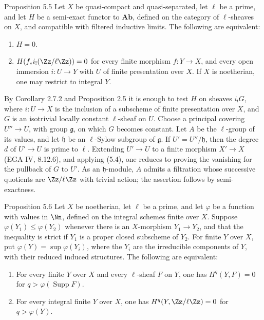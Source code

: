 \begin{statement}{Proposition 5.5}
Let \(X\) be quasi-compact and quasi-separated, let \(\ell\) be a prime, and let \(H\) be a semi-exact functor to \(\mathbf{Ab}\), defined on the category of \(\ell\)-sheaves on \(X\), and compatible with filtered inductive limits. The following are equivalent:
\begin{enumerate}[label=(\roman*)]
\item \(H=0\).
\item \(H(f_*i_!(\Zz/\ell\Zz))=0\) for every finite morphism \(f:Y\to X\), and every open immersion \(i:U\to Y\) with \(U\) of finite presentation over \(X\). If \(X\) is noetherian, one may restrict to integral \(Y\).
\end{enumerate}
\end{statement}

\begin{prooftext}
By Corollary 2.7.2 and Proposition 2.5 it is enough to test \(H\) on sheaves \(i_!G\), where \(i:U\to X\) is the inclusion of a subscheme of finite presentation over \(X\), and \(G\) is an isotrivial locally constant \(\ell\)-sheaf on \(U\). Choose a principal covering \(U''\to U\), with group \(\mathfrak g\), on which \(G\) becomes constant. Let \(A\) be the \(\ell\)-group of its values, and let \(\mathfrak h\) be an \(\ell\)-Sylow subgroup of \(\mathfrak g\). If \(U'=U''/\mathfrak h\), then the degree \(d\) of \(U'\to U\) is prime to \(\ell\). Extending \(U'\to U\) to a finite morphism \(X'\to X\) (EGA IV, 8.12.6), and applying (5.4), one reduces to proving the vanishing for the pullback of \(G\) to \(U'\). As an \(\mathfrak h\)-module, \(A\) admits a filtration whose successive quotients are \(\Zz/\ell\Zz\) with trivial action; the assertion follows by semi-exactness.
\end{prooftext}

\begin{statement}{Proposition 5.6}
Let \(X\) be noetherian, let \(\ell\) be a prime, and let \(\varphi\) be a function with values in \(\Nn\), defined on the integral schemes finite over \(X\). Suppose \(\varphi(Y_1)\leq\varphi(Y_2)\) whenever there is an \(X\)-morphism \(Y_1\to Y_2\), and that the inequality is strict if \(Y_1\) is a proper closed subscheme of \(Y_2\). For finite \(Y\) over \(X\), put \(\varphi(Y)=\sup\varphi(Y_i)\), where the \(Y_i\) are the irreducible components of \(Y\), with their reduced induced structures. The following are equivalent:
\begin{enumerate}[label=(\roman*)]
\item For every finite \(Y\) over \(X\) and every \(\ell\)-sheaf \(F\) on \(Y\), one has \(H^q(Y,F)=0\) for \(q>\varphi(\operatorname{Supp}F)\).
\item For every integral finite \(Y\) over \(X\), one has \(H^q(Y,\Zz/\ell\Zz)=0\) for \(q>\varphi(Y)\).
\end{enumerate}
\end{statement}

